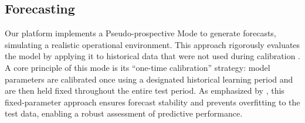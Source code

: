 \documentclass[extra,mreferee]{gji}
\theoremstyle{lemma}
\begin{document}
%

\subsection{Forecasting}
Our platform implements a Pseudo-prospective Mode to generate forecasts, simulating a realistic operational environment. This approach rigorously evaluates the model by applying it to historical data that were not used during calibration \cite{rhoades2011, rhoades202220, 2023ER}. A core principle of this mode is its “one-time calibration” strategy: model parameters are calibrated once using a designated historical learning period and are then held fixed throughout the entire test period. As emphasized by \cite{rhoades202220}, this fixed-parameter approach ensures forecast stability and prevents overfitting to the test data, enabling a robust assessment of predictive performance.
\end{document}
